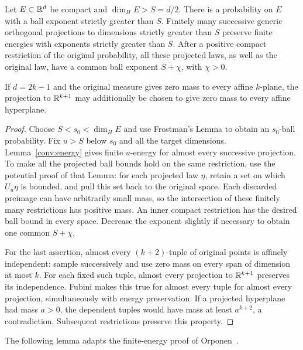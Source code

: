 \begin{lemma}\label{prep:projections}
Let $E\subset\mathbb R^d$ be compact and $\dim_HE>S=d/2$.
There is a probability on $E$ with a ball exponent strictly greater
than $S$. Finitely many successive generic orthogonal projections to
dimensions strictly greater than $S$ preserve finite energies with
exponents strictly greater than $S$. After a positive compact restriction
of the original probability, all these projected laws, as well as the
original law, have a common ball exponent $S+\chi$, with $\chi>0$.

If $d=2k-1$ and the original measure gives zero mass to every affine
$k$-plane, the projection to $\mathbb R^{k+1}$ may additionally be chosen
to give zero mass to every affine hyperplane.
\end{lemma}
\begin{proof}
Choose $S<s_0<\dim_HE$ and use Frostman's Lemma to obtain an
$s_0$-ball probability. Fix $u>S$ below $s_0$ and all the target
dimensions. Lemma~\ref{conv:energy} gives finite $u$-energy for
almost every successive projection. To make all the projected ball
bounds hold on the same restriction, use the potential proof of that
Lemma: for each projected law $\eta$, retain a set on which
$U_u\eta$ is bounded, and pull this set back to the original space.
Each discarded preimage can have arbitrarily small mass, so the
intersection of these finitely many restrictions has positive mass.
An inner compact restriction has the desired ball bound in every
space. Decrease the exponent slightly if necessary to obtain one
common $S+\chi$.

For the last assertion, almost every $(k+2)$-tuple of original points
is affinely independent: sample successively and use zero mass on
every span of dimension at most $k$. For each fixed such tuple,
almost every projection to $\mathbb R^{k+1}$ preserves its independence.
Fubini makes this true for almost every tuple for almost every
projection, simultaneously with energy preservation. If a projected
hyperplane had mass $a>0$, the dependent tuples would have mass at
least $a^{k+2}$, a contradiction. Subsequent restrictions preserve
this property.
\end{proof}

The following lemma adapts the finite-energy proof of
Orponen~\cite[Section~3 and the proof of Theorem~1.13]{Orponen2019}.


